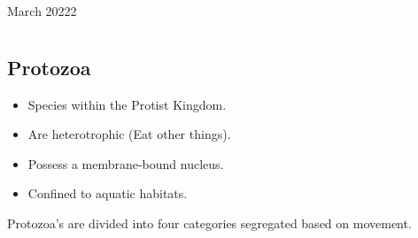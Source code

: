 \documentclass[12pt,oneside]{book} %
\begin{document}
	\renewcommand*{\term}{Term 2} %
	\renewcommand*{\coursecode}{MCR3U} %
	\renewcommand*{\coursename}{Course Name} %
	\renewcommand*{\thelecnum}{4} %
	\renewcommand*{\profname}{Prof Name} %
	\renewcommand*{\colink}{http://www.student.math.uwaterloo.ca/~c2kent} %
	\clearpage
	\pagestyle{classlecture}
\begin{lec}{March 20222}
	\chapter{\chapname\chaplec}

  \section*{Protozoa}
  \begin{itemize}
    \item Species within the Protist Kingdom.
    \item Are heterotrophic (Eat other things).
    \item Possess a membrane-bound nucleus.
    \item Confined to aquatic habitats.
  \end{itemize}

  
  Protozoa's are divided into four categories segregated based on movement.


\end{lec}
\end{document}
